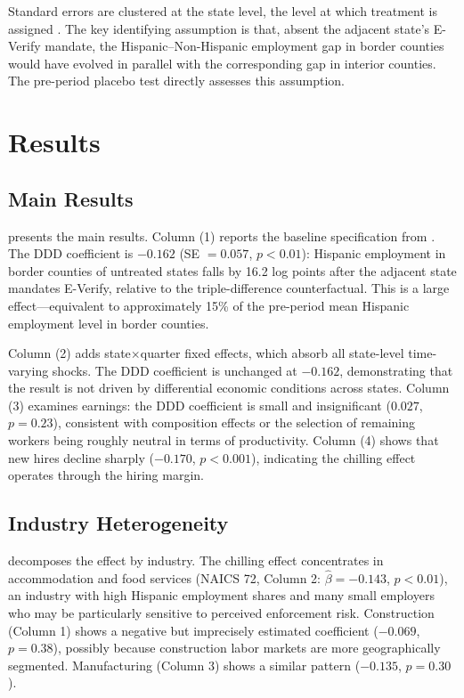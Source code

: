 \documentclass[12pt]{article}
\begin{document}
Standard errors are clustered at the state level, the level at which treatment is assigned \citep{bertrand2004}. The key identifying assumption is that, absent the adjacent state's E-Verify mandate, the Hispanic--Non-Hispanic employment gap in border counties would have evolved in parallel with the corresponding gap in interior counties. The pre-period placebo test directly assesses this assumption.

\section{Results}

\subsection{Main Results}



 presents the main results. Column (1) reports the baseline specification from . The DDD coefficient is $-0.162$ (SE $= 0.057$, $p < 0.01$): Hispanic employment in border counties of untreated states falls by 16.2 log points after the adjacent state mandates E-Verify, relative to the triple-difference counterfactual. This is a large effect---equivalent to approximately 15\% of the pre-period mean Hispanic employment level in border counties.

Column (2) adds state$\times$quarter fixed effects, which absorb all state-level time-varying shocks. The DDD coefficient is unchanged at $-0.162$, demonstrating that the result is not driven by differential economic conditions across states. Column (3) examines earnings: the DDD coefficient is small and insignificant ($0.027$, $p = 0.23$), consistent with composition effects or the selection of remaining workers being roughly neutral in terms of productivity. Column (4) shows that new hires decline sharply ($-0.170$, $p < 0.001$), indicating the chilling effect operates through the hiring margin.

\subsection{Industry Heterogeneity}



 decomposes the effect by industry. The chilling effect concentrates in accommodation and food services (NAICS 72, Column 2: $\hat{\beta} = -0.143$, $p < 0.01$), an industry with high Hispanic employment shares and many small employers who may be particularly sensitive to perceived enforcement risk. Construction (Column 1) shows a negative but imprecisely estimated coefficient ($-0.069$, $p = 0.38$), possibly because construction labor markets are more geographically segmented. Manufacturing (Column 3) shows a similar pattern ($-0.135$, $p = 0.30$).
\end{document}
